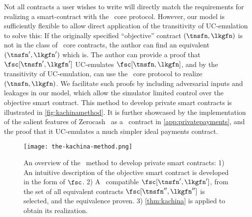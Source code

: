 \sloppy
Not all contracts a user wishes to write will directly match the requirements
for realizing a smart-contract with the \kachina\ core protocol. However, our
model is sufficiently flexible to allow direct application of the transitivity
of UC-emulation to solve this: If the originally specified ``objective''
contract $(\tnsfn, \lkgfn)$ is not in the class of \kachina\ core contracts, the
author can find an equivalent $(\tnsfn', \lkgfn')$ which is. The author can
provide a proof that $\fsc[\tnsfn', \lkgfn']$ UC-emulates $\fsc[\tnsfn,
\lkgfn]$, and by the transitivity of UC-emulation, can use the \kachina\ core
protocol to realize $(\tnsfn, \lkgfn)$. We facilitate such proofs by including
adversarial inputs and leakages in our model, which allow the simulator limited
control over the objective smart contract. This method to develop private smart
contracts is illustrated in \autoref{fig:kachinamethod}. It is further showcased by
the implementation of the salient features of Zerocash~\cite{SP:BCGGMT14} as a \kachina\
contract in \autoref{app:privatepayments}, and the proof that it UC-emulates a much
simpler ideal payments contract.

\fussy
\begin{figure}[h]
  \centering
  \texttt{[image: the-kachina-method.png]}
  \caption{An overview of the \kachina\ method to develop private smart
    contracts: 1) An intuitive description of the objective smart contract is
    developed in the form of $\fsc$. 2) A \kachina\ compatible $\fsc[\tnsfn',
    \lkgfn']$, from the set of all equivalent contracts $\fsc[\tnsfn'',
    \lkgfn'']$ is selected, and the equivalence proven. 3)
    \autoref{thm:kachina} is applied to obtain its realization.}
  \label{fig:kachinamethod}
\end{figure}

